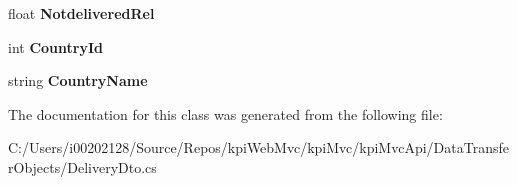 \begin{DoxyCompactItemize}
\item 
\mbox{\label{classkpi_mvc_api_1_1_data_transfer_objects_1_1_delivery_dto_a74702ba97da373adab874c2dc6422bc7}} 
float {\bfseries Notdelivered\+Rel}
\item 
\mbox{\label{classkpi_mvc_api_1_1_data_transfer_objects_1_1_delivery_dto_a96cbf3036055a923f4def0d846905af7}} 
int {\bfseries Country\+Id}
\item 
\mbox{\label{classkpi_mvc_api_1_1_data_transfer_objects_1_1_delivery_dto_a5ece3ff3a399d3b2baff4fccef29cdc1}} 
string {\bfseries Country\+Name}
\end{DoxyCompactItemize}


The documentation for this class was generated from the following file\+:\begin{DoxyCompactItemize}
\item 
C\+:/\+Users/i00202128/\+Source/\+Repos/kpi\+Web\+Mvc/kpi\+Mvc/kpi\+Mvc\+Api/\+Data\+Transfer\+Objects/Delivery\+Dto.\+cs\end{DoxyCompactItemize}
